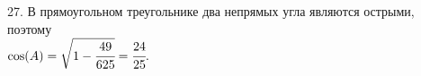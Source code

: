 27. В прямоугольном треугольнике два непрямых угла являются острыми, поэтому\\ $\cos(A)=\sqrt{1-\cfrac{49}{625}}=\cfrac{24}{25}.$\\
